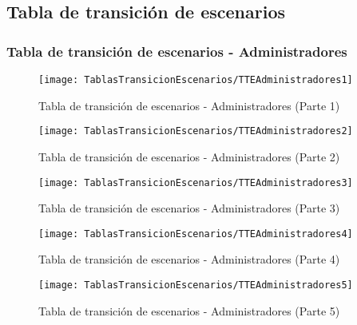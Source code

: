 \subsection{Tabla de transición de escenarios}
\subsubsection{Tabla de transición de escenarios - Administradores}
\begin{figure}[H]
    \centering
    \texttt{[image: TablasTransicionEscenarios/TTEAdministradores1]}
    \caption{Tabla de transición de escenarios - Administradores (Parte 1)}
\label{fig:TTEAdministradores1}
\end{figure}
\begin{figure}[H]
    \centering
    \texttt{[image: TablasTransicionEscenarios/TTEAdministradores2]}
    \caption{Tabla de transición de escenarios - Administradores (Parte 2)}
\label{fig:TTEAdministradores2}
\end{figure}
\begin{figure}[H]
    \centering
    \texttt{[image: TablasTransicionEscenarios/TTEAdministradores3]}
    \caption{Tabla de transición de escenarios - Administradores (Parte 3)}
\label{fig:TTEAdministradores3}
\end{figure}
\begin{figure}[H]
    \centering
    \texttt{[image: TablasTransicionEscenarios/TTEAdministradores4]}
    \caption{Tabla de transición de escenarios - Administradores (Parte 4)}
\label{fig:TTEAdministradores4}
\end{figure}
\begin{figure}[H]
    \centering
    \texttt{[image: TablasTransicionEscenarios/TTEAdministradores5]}
    \caption{Tabla de transición de escenarios - Administradores (Parte 5)}
\label{fig:TTEAdministradores5}
\end{figure}
